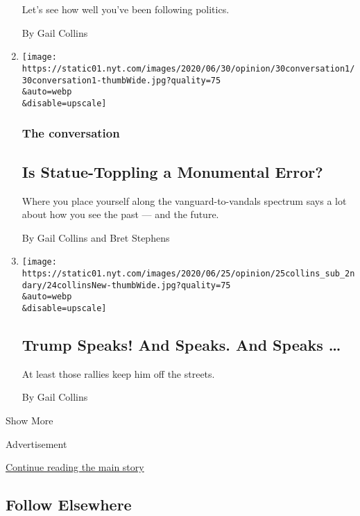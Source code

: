 \begin{enumerate}
  Let's see how well you've been following politics.

  By Gail Collins
\item
  \href{/2020/06/30/opinion/statues-protesters-jefferson-jackson.html}{}

  \texttt{[image: https://static01.nyt.com/images/2020/06/30/opinion/30conversation1/30conversation1-thumbWide.jpg?quality=75\\\&auto=webp\\\&disable=upscale]}

  \hypertarget{the-conversation-3}{%
  \subsubsection{The conversation}\label{the-conversation-3}}

  \hypertarget{is-statue-toppling-a-monumental-error}{%
  \subsection{Is Statue-Toppling a Monumental
  Error?}\label{is-statue-toppling-a-monumental-error}}

  Where you place yourself along the vanguard-to-vandals spectrum says a
  lot about how you see the past --- and the future.

  By Gail Collins and Bret Stephens
\item
  \href{/2020/06/24/opinion/trump-tulsa-2020.html}{}

  \texttt{[image: https://static01.nyt.com/images/2020/06/25/opinion/25collins\_sub\_2ndary/24collinsNew-thumbWide.jpg?quality=75\\\&auto=webp\\\&disable=upscale]}

  \hypertarget{trump-speaks-and-speaks-and-speaks-}{%
  \subsection{Trump Speaks! And Speaks. And Speaks
  \ldots{}}\label{trump-speaks-and-speaks-and-speaks-}}

  At least those rallies keep him off the streets.

  By Gail Collins
\end{enumerate}

Show More

Advertisement

\protect\hyperlink{after-mid2}{Continue reading the main story}

\hypertarget{follow-elsewhere}{%
\subsection{Follow Elsewhere}\label{follow-elsewhere}}

